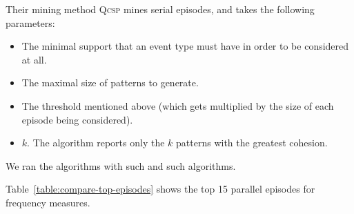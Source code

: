 Their mining method \textsc{Qcsp} mines serial episodes, and takes the following parameters:
\begin{itemize}
\item The minimal support that an event type must have in order to be considered at all.
\item The maximal size of patterns to generate.
\item The threshold mentioned above (which gets multiplied by the size of each episode being considered).
\item $ k $. The algorithm reports only the $ k $ patterns with the greatest cohesion.
\end{itemize}

We ran the algorithms with such and such algorithms.

Table~\ref{table:compare-top-episodes} shows the top 15 parallel episodes for frequency measures.


